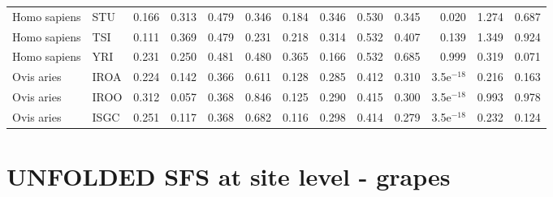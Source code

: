 \begin{longtable}{llrrrrrrrrrrr}
        Homo sapiens &                       STU &                              0.166 &                               0.313 &                 0.479 &                 0.346 &                              0.184 &                               0.346 &                 0.530 &                 0.345 &        0.020 &  1.274 &  0.687 \\
        Homo sapiens &                       TSI &                              0.111 &                               0.369 &                 0.479 &                 0.231 &                              0.218 &                               0.314 &                 0.532 &                 0.407 &        0.139 &  1.349 &  0.924 \\
        Homo sapiens &                       YRI &                              0.231 &                               0.250 &                 0.481 &                 0.480 &                              0.365 &                               0.166 &                 0.532 &                 0.685 &        0.999 &  0.319 &  0.071 \\
          Ovis aries &                      IROA &                              0.224 &                               0.142 &                 0.366 &                 0.611 &                              0.128 &                               0.285 &                 0.412 &                 0.310 & 3.5e$^{-18}$ &  0.216 &  0.163 \\
          Ovis aries &                      IROO &                              0.312 &                               0.057 &                 0.368 &                 0.846 &                              0.125 &                               0.290 &                 0.415 &                 0.300 & 3.5e$^{-18}$ &  0.993 &  0.978 \\
          Ovis aries &                      ISGC &                              0.251 &                               0.117 &                 0.368 &                 0.682 &                              0.116 &                               0.298 &                 0.414 &                 0.279 & 3.5e$^{-18}$ &  0.232 &  0.124 \\
\end{longtable}
\newpage\section*{UNFOLDED SFS at site level - grapes} 
